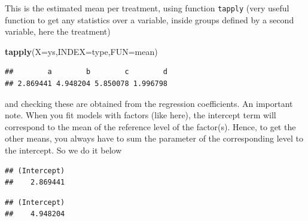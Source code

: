 \documentclass[
]{book}
\newenvironment{Shaded}{\begin{snugshade}}{\end{snugshade}}
\newcommand{\AttributeTok}[1]{\textcolor[rgb]{0.13,0.29,0.53}{#1}}
\newcommand{\CommentTok}[1]{\textcolor[rgb]{0.56,0.35,0.01}{\textit{#1}}}
\newcommand{\DecValTok}[1]{\textcolor[rgb]{0.00,0.00,0.81}{#1}}
\newcommand{\FunctionTok}[1]{\textcolor[rgb]{0.13,0.29,0.53}{\textbf{#1}}}
\newcommand{\NormalTok}[1]{#1}
\newcommand{\SpecialCharTok}[1]{\textcolor[rgb]{0.81,0.36,0.00}{\textbf{#1}}}
\begin{document}
This is the estimated mean per treatment, using function \texttt{tapply} (very useful function to get any statistics over a variable, inside groups defined by a second variable, here the treatment)

\begin{Shaded}
\begin{Highlighting}[]
\FunctionTok{tapply}\NormalTok{(}\AttributeTok{X=}\NormalTok{ys,}\AttributeTok{INDEX=}\NormalTok{type,}\AttributeTok{FUN=}\NormalTok{mean)}
\end{Highlighting}
\end{Shaded}

\begin{verbatim}
##        a        b        c        d 
## 2.869441 4.948204 5.850078 1.996798
\end{verbatim}

and checking these are obtained from the regression coefficients.
An important note. When you fit models with factors (like here), the intercept term will correspond to the mean of the reference level of the factor(s). Hence, to get the other means, you always have to sum the parameter of the corresponding level to the intercept. So we do it below

\begin{Shaded}
\end{Shaded}

\begin{verbatim}
## (Intercept) 
##    2.869441
\end{verbatim}

\begin{Shaded}
\end{Shaded}

\begin{verbatim}
## (Intercept) 
##    4.948204
\end{verbatim}

\begin{Shaded}
\end{Shaded}
\end{document}
